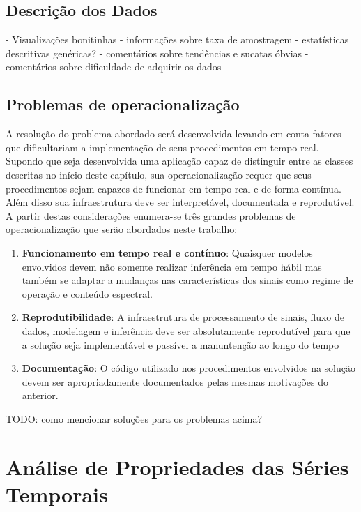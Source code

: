 \subsection{Descrição dos Dados}

- Visualizações bonitinhas
- informações sobre taxa de amostragem
- estatísticas descritivas genéricas?
- comentários sobre tendências e sucatas óbvias
- comentários sobre dificuldade de adquirir os dados

\subsection{Problemas de operacionalização}

A resolução do problema abordado será desenvolvida levando em conta fatores que
dificultariam a implementação de seus procedimentos em tempo real. Supondo que
seja desenvolvida uma aplicação capaz de distinguir entre as classes descritas
no início deste capítulo, sua operacionalização requer que seus procedimentos
sejam capazes de funcionar em tempo real e de forma contínua. Além disso sua
infraestrutura deve ser interpretável, documentada e reprodutível. A partir
destas considerações enumera-se três grandes problemas de operacionalização
que serão abordados neste trabalho:

\begin{enumerate}
    \item \textbf{Funcionamento em tempo real e contínuo}: Quaisquer modelos
    envolvidos devem não somente realizar inferência em tempo hábil mas também
    se adaptar a mudanças nas características dos sinais como regime de
    operação e conteúdo espectral.
    \item \textbf{Reprodutibilidade}: A infraestrutura de processamento de
    sinais, fluxo de dados, modelagem e inferência deve ser absolutamente
    reprodutível para que a solução seja implementável e passível a manuntenção
    ao longo do tempo
    \item \textbf{Documentação}: O código utilizado nos procedimentos
    envolvidos na solução devem ser apropriadamente documentados pelas mesmas
    motivações do anterior.
\end{enumerate}

TODO: como mencionar soluções para os problemas acima?

\section{Análise de Propriedades das Séries Temporais}

